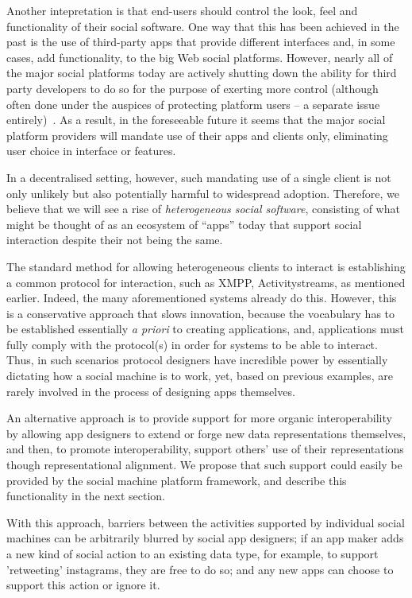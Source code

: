 \documentclass{sig-alternate}
\begin{document}
Another intepretation is that end-users should control the look, feel and functionality of their social software.  One way that this has been achieved in the past is the use of third-party apps that provide different interfaces and, in some cases, add functionality, to the big Web social platforms. However, nearly all of the major social platforms today are actively shutting down the ability for third party developers to do so for the purpose of exerting more control  (although often done under the auspices of protecting platform users -- a separate issue entirely)~\cite{shutdown}. As a result, in the foreseeable future it seems that the major social platform providers will mandate use of their apps and clients only, eliminating user choice in interface or features.

In a decentralised setting, however, such mandating use of a single client is not only unlikely but also potentially harmful to widespread adoption.  Therefore, we believe that we will see a rise of \emph{heterogeneous social software}, consisting of what might be thought of as an ecosystem of ``apps'' today that support social interaction despite their not being the same. 

The standard method for allowing heterogeneous clients to interact is establishing a common protocol for interaction, such as XMPP, Activitystreams, as mentioned earlier. Indeed, the many aforementioned systems already do this. However, this is a conservative approach that slows innovation, because the vocabulary has to be established essentially \emph{a priori} to creating applications, and, applications must fully comply with the protocol(s) in order for systems to be able to interact.  Thus, in such scenarios protocol designers have incredible power by essentially dictating how a social machine is to work, yet, based on previous examples, are rarely involved in the process of designing apps themselves.

An alternative approach is to provide support for more organic interoperability by allowing app designers to extend or forge new data representations themselves, and then, to promote interoperability, support others' use of their representations though representational alignment. We propose that such support could easily be provided by the social machine platform framework, and describe this functionality in the next section.  

With this approach, barriers between the activities supported by individual social machines can be arbitrarily blurred by social app designers; if an app maker adds a new kind of social action to an existing data type, for example, to support 'retweeting' instagrams, they are free to do so; and any new apps can choose to support this action or ignore it.
\end{document}
